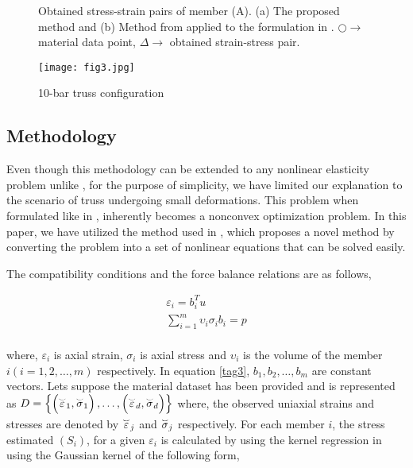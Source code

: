 \documentclass[conference]{IEEEtran}
\begin{document}
\begin{figure*}[hb]
\centering
{}
\caption{Obtained stress-strain pairs of member (A). (a) The proposed method and (b) Method from \cite{24} applied to the formulation in \cite{14}. $\bigcirc  \to $ material data point, $\Delta  \to $ obtained strain-stress pair.
}
\label{fig7}
\end{figure*}

\begin{figure}[htbp]
\centerline{\texttt{[image: fig3.jpg]}}
\caption{10-bar truss configuration \cite{26} }
\label{fig3}
\end{figure}

\subsection{Methodology}
Even though this methodology can be extended to any nonlinear elasticity problem unlike \cite{24}, for the purpose of simplicity, we have limited our explanation to the scenario of truss undergoing small deformations. This problem when formulated like in \cite{15}, inherently becomes a nonconvex optimization \cite{25} problem. In this paper, we have utilized the method used in \cite{26}, which proposes a novel method by converting the problem into a set of nonlinear equations that can be solved easily.

The compatibility conditions and the force balance relations are as follows,

\[\begin{gathered}
  {\varepsilon _i} = b_i^Tu \\ 
  \sum\limits_{i = 1}^m {{\upsilon _i}{\sigma _i}{b_i}}  = p \\ 
\end{gathered} \tag{3}\label{tag3}\]

where, ${\varepsilon _i}$ is axial strain, ${{\sigma _i}}$ is axial stress and $\upsilon _i$ is the volume of the member $i (i = 1,2, \ldots ,m)$ respectively. In equation \eqref{tag3}, $b _1,b _2, \ldots ,b _m$ are constant vectors. Lets suppose the material dataset has been provided and is represented as $D = \left\{ {\left( {{{\overset{\lower0.5em\hbox{$\smash{\scriptscriptstyle\smile}$}}{\varepsilon } }_1},{{\overset{\lower0.5em\hbox{$\smash{\scriptscriptstyle\smile}$}}{\sigma } }_1}} \right), \ldots ,\left( {{{\overset{\lower0.5em\hbox{$\smash{\scriptscriptstyle\smile}$}}{\varepsilon } }_d},{{\overset{\lower0.5em\hbox{$\smash{\scriptscriptstyle\smile}$}}{\sigma } }_d}} \right)} \right\}$ where, the observed uniaxial strains and stresses are denoted by ${{{\overset{\lower0.5em\hbox{$\smash{\scriptscriptstyle\smile}$}}{\varepsilon } }_j}}$ and ${{{\overset{\lower0.5em\hbox{$\smash{\scriptscriptstyle\smile}$}}{\sigma } }_j}}$ respectively. For each member $i$, the stress estimated $(S _i)$, for a given ${{\varepsilon _i}}$ is calculated by using the kernel regression \cite{31} in \cite{26} using the Gaussian kernel of the following form,
\end{document}

